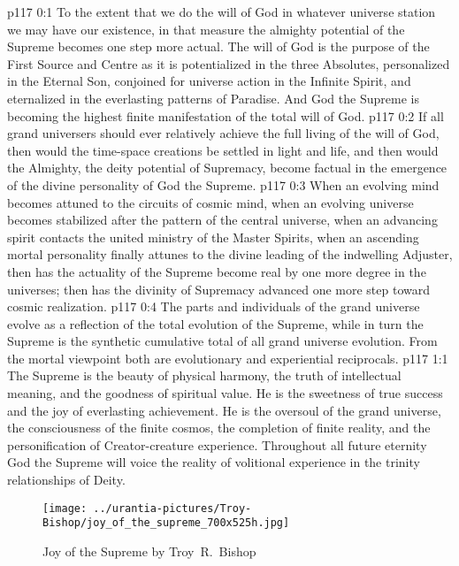 \author{Mighty Messenger}
\vs p117 0:1 To the extent that we do the will of God in whatever universe station we may have our existence, in that measure the almighty potential of the Supreme becomes one step more actual. The will of God is the purpose of the First Source and Centre as it is potentialized in the three Absolutes, personalized in the Eternal Son, conjoined for universe action in the Infinite Spirit, and eternalized in the everlasting patterns of Paradise. And God the Supreme is becoming the highest finite manifestation of the total will of God.
\vs p117 0:2 If all grand universers should ever relatively achieve the full living of the will of God, then would the time\hyp{}space creations be settled in light and life, and then would the Almighty, the deity potential of Supremacy, become factual in the emergence of the divine personality of God the Supreme.
\vs p117 0:3 When an evolving mind becomes attuned to the circuits of cosmic mind, when an evolving universe becomes stabilized after the pattern of the central universe, when an advancing spirit contacts the united ministry of the Master Spirits, when an ascending mortal personality finally attunes to the divine leading of the indwelling Adjuster, then has the actuality of the Supreme become real by one more degree in the universes; then has the divinity of Supremacy advanced one more step toward cosmic realization.
\vs p117 0:4 The parts and individuals of the grand universe evolve as a reflection of the total evolution of the Supreme, while in turn the Supreme is the synthetic cumulative total of all grand universe evolution. From the mortal viewpoint both are evolutionary and experiential reciprocals.
\vs p117 1:1 The Supreme is the beauty of physical harmony, the truth of intellectual meaning, and the goodness of spiritual value. He is the sweetness of true success and the joy of everlasting achievement. He is the oversoul of the grand universe, the consciousness of the finite cosmos, the completion of finite reality, and the personification of Creator\hyp{}creature experience. Throughout all future eternity God the Supreme will voice the reality of volitional experience in the trinity relationships of Deity.
\begin{figure}[H]
\centering
\texttt{[image: ../urantia-pictures/Troy-Bishop/joy\_of\_the\_supreme\_700x525h.jpg]}
\caption{Joy of the Supreme by Troy~R.~Bishop}
\end{figure}
